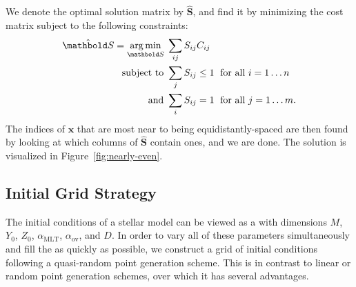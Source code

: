 We denote the optimal solution matrix by $\hat{\boldsymbol{S}}$, and find it by minimizing the cost matrix subject to the following constraints:
\begin{align}
  \hat{\boldsymbol{S}} = \underset{\boldsymbol S}{\arg\min} \; & \sum_{ij} S_{ij} C_{ij} \notag\\
  \text{subject to } & \sum_j S_{ij} \leq 1 \; \text{ for all } i=1\ldots n \notag\\
  \text{and } & \sum_i S_{ij} = 1 \; \text{ for all } j=1\ldots m.
  \label{eq:optimal-spacing}
\end{align}
The indices of $\mathbf x$ that are most near to being equidistantly-spaced are then found by looking at which columns of $\hat{\boldsymbol S}$ contain ones, and we are done. The solution is visualized in Figure~\ref{fig:nearly-even}.



\subsection{Initial Grid Strategy}
\label{sec:grid}
The initial conditions of a stellar model can be viewed as a  with dimensions $M$, $Y_0$, $Z_0$, $\alpha_{\text{MLT}}$, $\alpha_{\text{ov}}$, and $D$. In order to vary all of these parameters simultaneously and fill the  as quickly as possible, we construct a grid of initial conditions following a quasi-random point generation scheme. This is in contrast to linear or random point generation schemes, over which it has several advantages. 


